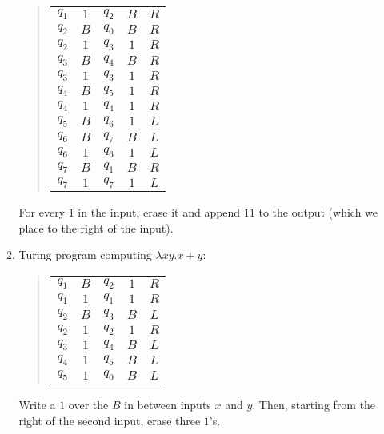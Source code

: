 \documentclass[a4paper,11pt]{article}
\begin{document}
\begin{enumerate}
\begin{enumerate}
\begin{quote}
\begin{tabular}{ccccc}
  $q_1$ & $1$ & $q_2$ & $B$ & $R$\\ %
  $q_2$ & $B$ & $q_0$ & $B$ & $R$\\ %
  $q_2$ & $1$ & $q_3$ & $1$ & $R$\\
  $q_3$ & $B$ & $q_4$ & $B$ & $R$\\ %
  $q_3$ & $1$ & $q_3$ & $1$ & $R$\\
  $q_4$ & $B$ & $q_5$ & $1$ & $R$\\ %
  $q_4$ & $1$ & $q_4$ & $1$ & $R$\\
  $q_5$ & $B$ & $q_6$ & $1$ & $L$\\ %
  $q_6$ & $B$ & $q_7$ & $B$ & $L$\\ %
  $q_6$ & $1$ & $q_6$ & $1$ & $L$\\
  $q_7$ & $B$ & $q_1$ & $B$ & $R$\\ %
  $q_7$ & $1$ & $q_7$ & $1$ & $L$
\end{tabular}
\end{quote}

For every $1$ in the input, erase it and append $11$ to
the output (which we place to the right of the input).

\item Turing program computing $\lambda x y.x+y$:

\begin{quote}
\begin{tabular}{ccccc}
  $q_1$ & $B$ & $q_2$ & $1$ & $R$\\ %
  $q_1$ & $1$ & $q_1$ & $1$ & $R$\\
  $q_2$ & $B$ & $q_3$ & $B$ & $L$\\ %
  $q_2$ & $1$ & $q_2$ & $1$ & $R$\\
  $q_3$ & $1$ & $q_4$ & $B$ & $L$\\ %
  $q_4$ & $1$ & $q_5$ & $B$ & $L$\\ %
  $q_5$ & $1$ & $q_0$ & $B$ & $L$   %
\end{tabular}
\end{quote}

Write a $1$ over the $B$ in between inputs $x$ and $y$. Then, starting
from the right of the second input, erase three $1$'s.
\end{enumerate}


\end{enumerate}
\end{document}
